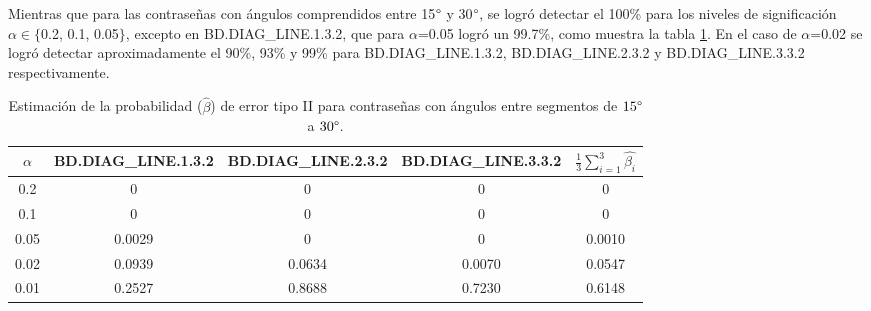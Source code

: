 \documentclass[12pt]{report}
\begin{document}


Mientras que para las contraseñas con ángulos comprendidos entre 15$\degree$ y 30$\degree$, se logró detectar el 100\% para los niveles de significación $\alpha \in \{$0.2, 0.1, 0.05$\}$, excepto en BD.DIAG\_LINE.1.3.2, que para $\alpha$=0.05 logró un 99.7\%, como muestra la tabla \ref{tab:error2-15-30}. En el caso de $\alpha$=0.02 se logró detectar aproximadamente el 90\%, 93\% y 99\% para BD.DIAG\_LINE.1.3.2, BD.DIAG\_LINE.2.3.2 y BD.DIAG\_LINE.3.3.2 respectivamente.

\begin{table}[h!]
	\centering
	\begin{tabular}{|c|ccc|c|}
		\hline
		$\alpha$& BD.DIAG\_LINE.1.3.2 & BD.DIAG\_LINE.2.3.2 & BD.DIAG\_LINE.3.3.2 &$\frac{1}{3} \sum_{i=1}^{3} \hat{\beta_i}$ \\
		\hline
		0.2 & 0     	    & 0     		& 0     & 0    \\
		0.1 & 0			    & 0   	   	    & 0     &  0   \\
		0.05& 0.0029     	& 0     	 & 0     & 0.0010 \\
		0.02& 0.0939     	& 0.0634   	 & 0.0070 & 0.0547    \\
		0.01& 0.2527     	& 0.8688   & 0.7230 & 0.6148     \\
		\hline
	\end{tabular}
	\caption{Estimación de la probabilidad ($\hat{\beta}$) de error tipo II para contraseñas con ángulos entre segmentos de $15\degree$ a $30\degree$.}
	\label{tab:error2-15-30}
\end{table}
\end{document}
